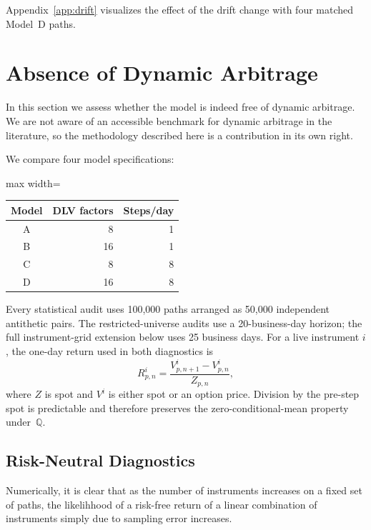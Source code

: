 \documentclass[11pt]{article}
\newcommand{\Q}{\mathbb Q}
\theoremstyle{plain}
\theoremstyle{definition}
\theoremstyle{remark}
\begin{document}
Appendix~\ref{app:drift} visualizes the effect of the drift change
with four matched Model~D paths.  

\section{Absence of Dynamic Arbitrage}\label{sec:numerics}

In this section we assess whether the model is indeed free of dynamic arbitrage.
We are not aware of an accessible benchmark for dynamic arbitrage in the literature, so
the methodology described here is a contribution in its own right.

We compare four model specifications:
\begin{center}
\begin{adjustbox}{max width=\textwidth}
\begin{tabular}{crr}
\toprule
Model & DLV factors & Steps/day\\
\midrule
A & 8  & 1\\
B & 16 & 1\\
C & 8  & 8\\
D & 16 & 8\\
\bottomrule
\end{tabular}
\end{adjustbox}
\end{center}
Every statistical audit uses 100,000 paths arranged as 50,000 independent antithetic
pairs.  The restricted-universe audits use a 20-business-day horizon; the full
instrument-grid extension below uses 25 business days.  For a live instrument $i$, the
one-day return used in both diagnostics is
\begin{equation}\label{eq:numerics-spot-scaled-return}
R_{p,n}^i
=\frac{V_{p,n+1}^i-V_{p,n}^i}{Z_{p,n}},
\end{equation}
where $Z$ is spot and $V^i$ is either spot or an option price.  Division by the
pre-step spot is predictable and therefore preserves the zero-conditional-mean
property under~$\Q$.

\subsection{Risk-Neutral Diagnostics}
\label{sec:numerics-audit-definition}

Numerically, it is clear that as the number
of instruments increases on a fixed set of paths, the likelihhood of a risk-free return
of a linear combination of instruments simply due to sampling error increases.
\end{document}
